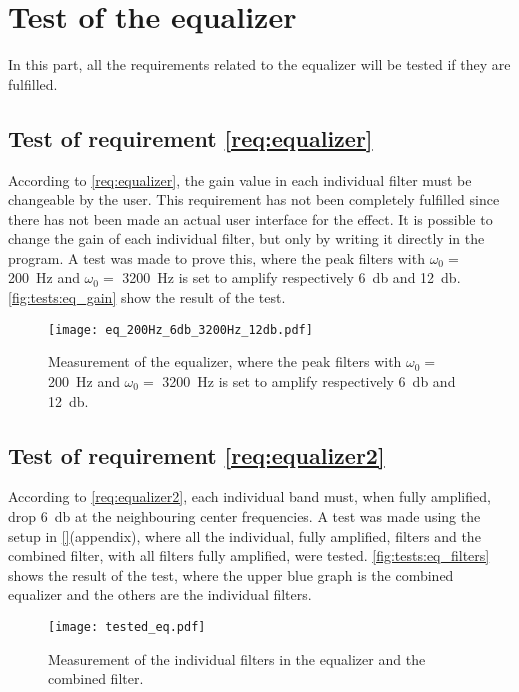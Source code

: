 \newpage
\section{Test of the equalizer}
In this part, all the requirements related to the equalizer will be tested if they are fulfilled. 


\subsection{Test of requirement \autoref{req:equalizer}}
According to \autoref{req:equalizer}, the gain value in each individual filter must be changeable by the user. This requirement has not been completely fulfilled since there has not been made an actual user interface for the effect. It is possible to change the gain of each individual filter, but only by writing it directly in the program. A test was made to prove this, where the peak filters with $\omega_0 =$ \SI{200}{\hertz} and $\omega_0 =$ \SI{3200}{\hertz} is set to amplify respectively \SI{6}{\decibel} and \SI{12}{\decibel}. 
\autoref{fig:tests:eq_gain} show the result of the test.

\begin{figure}[htbp!]
    \centering
        \texttt{[image: eq\_200Hz\_6db\_3200Hz\_12db.pdf]}
        \caption{Measurement of the equalizer, where the peak filters with $\omega_0 =$ \SI{200}{\hertz} and $\omega_0 =$ \SI{3200}{\hertz} is set to amplify respectively \SI{6}{\decibel} and \SI{12}{\decibel}.}
        \label{fig:tests:eq_gain}
  \end{figure}



\subsection{Test of requirement \autoref{req:equalizer2}}
According to \autoref{req:equalizer2}, each individual band must, when fully amplified, drop \SI{6}{\decibel} at the neighbouring center frequencies. A test was made using  the setup in \autoref{}(appendix), where all the individual, fully amplified, filters and the combined filter, with all filters fully amplified, were tested. \autoref{fig:tests:eq_filters} shows the result of the test, where the upper blue graph is the combined equalizer and the others are the individual filters.

\begin{figure}[htbp!]
    \centering
        \texttt{[image: tested\_eq.pdf]}
        \caption{Measurement of the individual filters in the equalizer and the combined filter.}
        \label{fig:tests:eq_filters}
  \end{figure}
  
